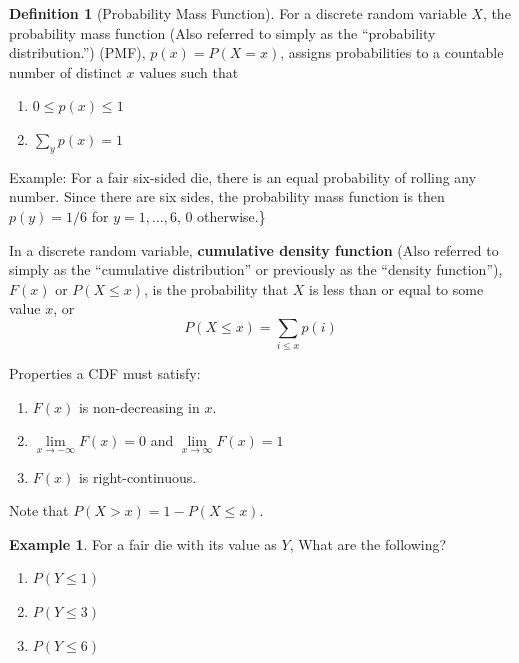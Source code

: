 \documentclass[
]{book}
\providecommand{\tightlist}{%
  \setlength{\itemsep}{0pt}\setlength{\parskip}{0pt}}
\theoremstyle{definition}
\newtheorem{definition}{Definition}[chapter]
\theoremstyle{definition}
\newtheorem{example}{Example}[chapter]
\theoremstyle{definition}
\theoremstyle{remark}
\begin{document}
\begin{definition}[Probability Mass Function]
\protect\hypertarget{def:unnamed-chunk-76}{}{\label{def:unnamed-chunk-76} {} }
For a discrete random variable \(X\), the probability mass function (Also referred to simply as the ``probability distribution.'') (PMF), \(p(x)=P(X=x)\), assigns probabilities to a countable number of distinct \(x\) values such that

\begin{enumerate}
\def\labelenumi{\arabic{enumi}.}
\tightlist
\item
  \(0\le p(x)\le 1\)
\item
  \(\sum\limits_y p(x)=1\)
\end{enumerate}
\end{definition}

Example: For a fair six-sided die, there is an equal probability of rolling any number. Since there are six sides, the probability mass function is then \(p(y)=1/6\) for \(y=1,\ldots,6\), 0 otherwise.\}

In a discrete random variable, \textbf{cumulative density function} (Also referred to simply as the ``cumulative distribution'' or previously as the ``density function''), \(F(x)\) or \(P(X\le x)\), is the probability that \(X\) is less than or equal to some value \(x\), or \[P(X\le x)=\sum\limits_{i\le x} p(i)\]

Properties a CDF must satisfy:

\begin{enumerate}
\def\labelenumi{\arabic{enumi}.}
\tightlist
\item
  \(F(x)\) is non-decreasing in \(x\).
\item
  \(\lim\limits_{x \to -\infty} F(x) = 0\) and \(\lim\limits_{x \to \infty} F(x) = 1\)
\item
  \(F(x)\) is right-continuous.
\end{enumerate}

Note that \(P(X > x) = 1 - P(X \le x)\).

\begin{example}
\protect\hypertarget{exm:unnamed-chunk-77}{}{\label{exm:unnamed-chunk-77} }For a fair die with its value as \(Y\), What are the following?

\begin{enumerate}
\def\labelenumi{\arabic{enumi}.}
\tightlist
\item
  \(P(Y\le 1)\)
\item
  \(P(Y\le 3)\)
\item
  \(P(Y\le 6)\)
\end{enumerate}
\end{example}
\end{document}
